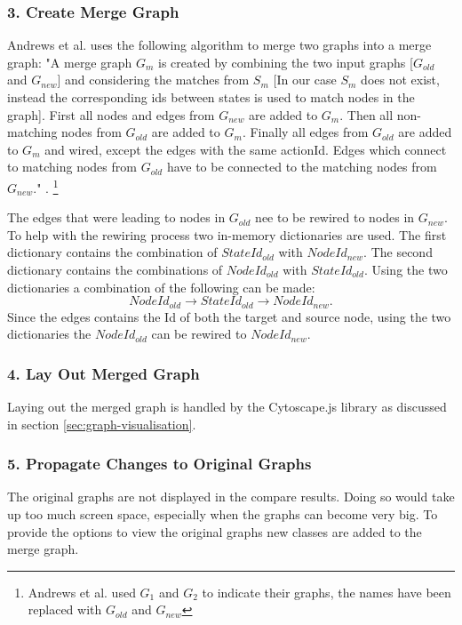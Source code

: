 \subsubsection{3. Create Merge Graph}
Andrews et al. uses the following algorithm to merge two graphs into a merge graph: "A merge graph $G_m$ is created by combining the two input graphs [$G_{old}$ and $G_{new}$] and considering the matches from $S_m$ [In our case $S_m$ does not exist, instead the corresponding ids between states is used to match nodes in the graph]. First all nodes and edges from $G_{new}$ are added to $G_m$. Then all non-matching nodes from $G_{old}$ are added to $G_m$. Finally all edges from $G_{old}$ are added to $G_m$ and wired, except the edges with the same actionId. Edges which connect to matching nodes from $G_{old}$ have to be connected to the matching nodes from $G_{new}$." \cite{andrews2009visual}. \footnote{Andrews et al. used $G_1$ and $G_2$ to indicate their graphs, the names have been replaced with $G_{old}$ and $G_{new}$}

The edges that were leading to nodes in $G_{old}$ nee to be rewired to nodes in $G_{new}$. To help with the rewiring process two in-memory dictionaries are used. The first dictionary contains the combination of $StateId_{old}$ with $NodeId_{new}$. The second dictionary contains the combinations of $NodeId_{old}$ with $StateId_{old}$. Using the two dictionaries a combination of the following can be made:
\[ NodeId_{old} \rightarrow  StateId_{old} \rightarrow NodeId_{new}. \]
Since the edges contains the Id of both the target and source node, using the two dictionaries the $NodeId_{old}$ can be rewired to $NodeId_{new}$.

\subsubsection{4. Lay Out Merged Graph}

Laying out the merged graph is handled by the Cytoscape.js library as discussed in section \ref{sec:graph-visualisation}.

\subsubsection{5. Propagate Changes to Original Graphs}

The original graphs are not displayed in the compare results. Doing so would take up too much screen space, especially when the graphs can become very big. To provide the options to view the original graphs new classes are added to the merge graph. 

